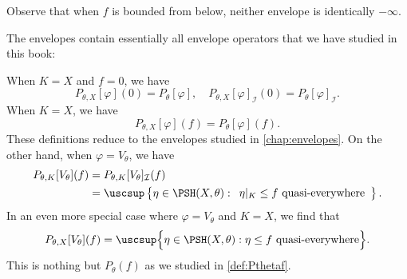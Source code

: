 Observe that when $f$ is bounded from below, neither envelope is identically $-\infty$.



The envelopes contain essentially all envelope operators that we have studied in this book:
\begin{example}\label{ex:rel_env_cases}
    When $K=X$ and $f=0$, we have
    \[
        P_{\theta,X}[\varphi](0)=P_{\theta}[\varphi],\quad P_{\theta,X}[\varphi]_{\mathcal{I}}(0)=P_{\theta}[\varphi]_{\mathcal{I}}.
    \]
    When $K=X$, we have
    \[
        P_{\theta,X}[\varphi](f)=P_{\theta}[\varphi](f).
    \]
    These definitions reduce to the envelopes studied in \cref{chap:envelopes}.
    On the other hand, when $\varphi=V_{\theta}$, we have
    \[
    \begin{aligned}
        P_{\theta,K}[V_{\theta}](f)
        &=P_{\theta,K}[V_{\theta}]_{\mathcal{I}}(f)\\
        &=\uscsup \left\{ \eta \in \PSH(X,\theta):
        \begin{array}{l}
        \eta|_K \leq f \textup{ quasi-everywhere}
        \end{array}
        \right\}.
    \end{aligned}
    \]
    In an even more special case where $\varphi=V_{\theta}$ and $K=X$, we find that
    \[
        P_{\theta,X}[V_{\theta}](f)=\uscsup \Bigl\{ \eta \in \PSH(X,\theta): \eta \leq f \textup{ quasi-everywhere}\Bigr\}.
    \]
    This is nothing but $P_{\theta}(f)$ as we studied in \cref{def:Pthetaf}.
\end{example}



